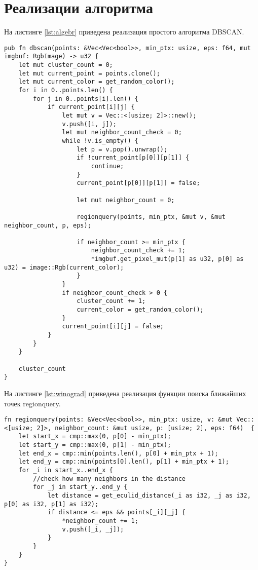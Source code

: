 \section{Реализации алгоритма}
На листинге \ref{lst:algebr} приведена реализация простого алгоритма DBSCAN. 
\newpage

\captionsetup{singlelinecheck = false, justification=raggedright}
\begin{lstlisting}[label=lst:algebr,caption=Реализация простого алгоритма DBSCAN]
pub fn dbscan(points: &Vec<Vec<bool>>, min_ptx: usize, eps: f64, mut imgbuf: RgbImage) -> u32 {
	let mut cluster_count = 0;
	let mut current_point = points.clone();
	let mut current_color = get_random_color();
	for i in 0..points.len() {
		for j in 0..points[i].len() {
			if current_point[i][j] {
				let mut v = Vec::<[usize; 2]>::new();
				v.push([i, j]);
				let mut neighbor_count_check = 0;
				while !v.is_empty() {
					let p = v.pop().unwrap();
					if !current_point[p[0]][p[1]] {
						continue;
					}
					current_point[p[0]][p[1]] = false;
					
					let mut neighbor_count = 0;
					
					regionquery(points, min_ptx, &mut v, &mut neighbor_count, p, eps);
					
					if neighbor_count >= min_ptx {
						neighbor_count_check += 1;
						*imgbuf.get_pixel_mut(p[1] as u32, p[0] as u32) = image::Rgb(current_color);
					}
				}
				if neighbor_count_check > 0 {
					cluster_count += 1;
					current_color = get_random_color();
				}
				current_point[i][j] = false;
			}
		}
	}
	
	cluster_count
}
\end{lstlisting}


На листинге \ref{lst:winograd} приведена реализация функции поиска ближайших точек regionquery.

\begin{lstlisting}[label=lst:winograd,caption=Реализация функции regionquery]
fn regionquery(points: &Vec<Vec<bool>>, min_ptx: usize, v: &mut Vec::<[usize; 2]>, neighbor_count: &mut usize, p: [usize; 2], eps: f64)  {
	let start_x = cmp::max(0, p[0] - min_ptx);
	let start_y = cmp::max(0, p[1] - min_ptx);
	let end_x = cmp::min(points.len(), p[0] + min_ptx + 1);
	let end_y = cmp::min(points[0].len(), p[1] + min_ptx + 1);
	for _i in start_x..end_x {
		//check how many neighbors in the distance
		for _j in start_y..end_y {
			let distance = get_eculid_distance(_i as i32, _j as i32, p[0] as i32, p[1] as i32);
			if distance <= eps && points[_i][_j] {
				*neighbor_count += 1;
				v.push([_i, _j]);
			}
		}
	}
}
\end{lstlisting}	

